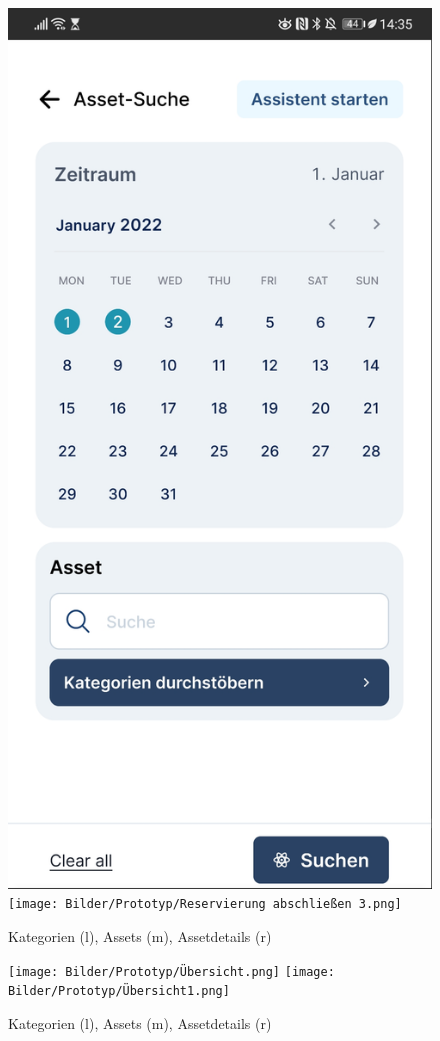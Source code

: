 \begin{figure}[h]
    \includegraphics[scale=0.1]{Bilder/Prototyp/Kalender.jpg}
    \texttt{[image: Bilder/Prototyp/Reservierung abschließen 3.png]}
    \label{fig:p3}
    \caption[Mockup: Kategorien, Assets, Assetdetails]{Kategorien (l), Assets (m), Assetdetails (r)}
\end{figure}


\begin{figure}[h]
    \centering
    \texttt{[image: Bilder/Prototyp/Übersicht.png]}
    \texttt{[image: Bilder/Prototyp/Übersicht1.png]}
    \label{fig:p4}
    \caption[Mockup: Kategorien, Assets, Assetdetails]{Kategorien (l), Assets (m), Assetdetails (r)}
\end{figure}


